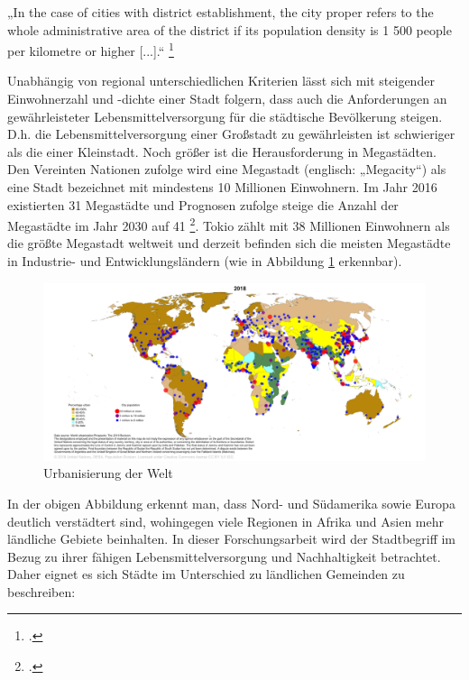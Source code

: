 \documentclass{scrartcl}
\begin{document}
\begin{displayquote}
„In the case of cities with district establishment, the city proper refers to the whole administrative area of the district if its population density is 1 500 people per kilometre or higher [...].“ \footcite[S.~2]{UnitedNations2005Table2005} 
\end{displayquote}

Unabhängig von regional unterschiedlichen Kriterien lässt sich mit steigender Einwohnerzahl und -dichte einer Stadt folgern, dass auch die Anforderungen an gewährleisteter Lebensmittelversorgung für die städtische Bevölkerung steigen. D.h. die Lebensmittelversorgung einer Großstadt zu gewährleisten ist schwieriger als die einer Kleinstadt. Noch größer ist die Herausforderung in Megastädten. Den Vereinten Nationen zufolge wird eine Megastadt (englisch: „Megacity“) als eine Stadt bezeichnet mit mindestens 10 Millionen Einwohnern. Im Jahr 2016 existierten 31 Megastädte und Prognosen zufolge steige die Anzahl der Megastädte im Jahr 2030 auf 41 \footcite{UnitedNations2016The2016}. Tokio zählt mit 38 Millionen Einwohnern als die größte Megastadt weltweit und derzeit befinden sich die meisten Megastädte in Industrie- und Entwicklungsländern (wie in Abbildung \ref{figUrban} erkennbar). 

\begin{figure}[htbp]
\centering
\hspace*{-3cm}   
\includegraphics[width=20cm]{image_folder/CityPop_Urban.png}
\caption{Urbanisierung der Welt}
\label{figUrban}
\end{figure}

\FloatBarrier
In der obigen Abbildung erkennt man, dass Nord- und Südamerika sowie Europa deutlich verstädtert sind, wohingegen viele Regionen in Afrika und Asien mehr ländliche Gebiete beinhalten. In dieser Forschungsarbeit wird der Stadtbegriff im Bezug zu ihrer fähigen Lebensmittelversorgung und Nachhaltigkeit betrachtet. Daher eignet es sich Städte im Unterschied zu ländlichen Gemeinden zu beschreiben: 
\end{document}
